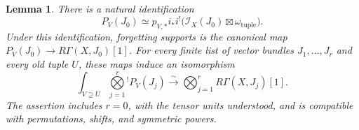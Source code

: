 \documentclass[11pt]{article}
\numberwithin{equation}{section}
\newtheorem{lemma}[theorem]{Lemma}
\theoremstyle{definition}
\theoremstyle{remark}
\begin{document}
\begin{lemma}\label{lem:ran-principal-parts}
There is a natural identification
\begin{equation}\label{eq:T17}
 P_V(J_0)\simeq
 p_{V,*}i_*i^!\bigl(\mathcal I_X(J_0)
                         \boxtimes\omega_{\mathrm{tuple}}\bigr).
\end{equation}
Under this identification, forgetting supports is the canonical map
$P_V(J_0)\to R\Gamma(X,J_0)[1]$.  For every finite list of vector bundles
$J_1,\ldots,J_r$ and every old tuple $U$, these maps induce an isomorphism
\begin{equation}\label{eq:T18}
 \int_{V\supseteq U}\mathop{\bigotimes}\limits_{j=1}^r{}^{!} P_V(J_j)
 \xrightarrow{\ \sim\ }
 \bigotimes_{j=1}^r R\Gamma(X,J_j)[1].
\end{equation}
The assertion includes $r=0$, with the tensor units understood, and is
compatible with permutations, shifts, and symmetric powers.
\end{lemma}
\end{document}
